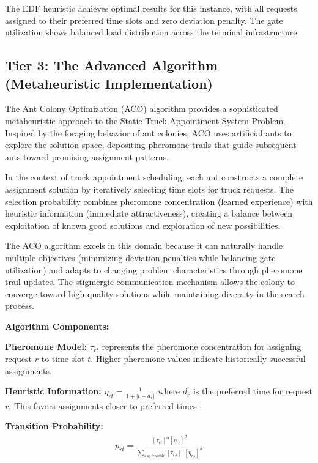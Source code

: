 \documentclass{article}
\begin{document}
The EDF heuristic achieves optimal results for this instance, with all requests assigned to their preferred time slots and zero deviation penalty. The gate utilization shows balanced load distribution across the terminal infrastructure.

\subsection{Tier 3: The Advanced Algorithm (Metaheuristic Implementation)}

The Ant Colony Optimization (ACO) algorithm provides a sophisticated metaheuristic approach to the Static Truck Appointment System Problem. Inspired by the foraging behavior of ant colonies, ACO uses artificial ants to explore the solution space, depositing pheromone trails that guide subsequent ants toward promising assignment patterns.

In the context of truck appointment scheduling, each ant constructs a complete assignment solution by iteratively selecting time slots for truck requests. The selection probability combines pheromone concentration (learned experience) with heuristic information (immediate attractiveness), creating a balance between exploitation of known good solutions and exploration of new possibilities.

The ACO algorithm excels in this domain because it can naturally handle multiple objectives (minimizing deviation penalties while balancing gate utilization) and adapts to changing problem characteristics through pheromone trail updates. The stigmergic communication mechanism allows the colony to converge toward high-quality solutions while maintaining diversity in the search process.

\textbf{Algorithm Components:}

\textbf{Pheromone Model:} $\tau_{rt}$ represents the pheromone concentration for assigning request $r$ to time slot $t$. Higher pheromone values indicate historically successful assignments.

\textbf{Heuristic Information:} $\eta_{rt} = \frac{1}{1 + |t - d_r|}$ where $d_r$ is the preferred time for request $r$. This favors assignments closer to preferred times.

\textbf{Transition Probability:} 
\begin{align}
p_{rt} = \frac{[\tau_{rt}]^\alpha [\eta_{rt}]^\beta}{\sum_{s \in \text{feasible}} [\tau_{rs}]^\alpha [\eta_{rs}]^\beta}
\end{align}
\end{document}
